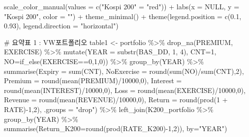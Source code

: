 \documentclass[
  a4paper,
  DIV=11,
  numbers=noendperiod]{scrreprt}
\newenvironment{Shaded}{\begin{snugshade}}{\end{snugshade}}
\newcommand{\AttributeTok}[1]{\textcolor[rgb]{0.40,0.45,0.13}{#1}}
\newcommand{\CommentTok}[1]{\textcolor[rgb]{0.37,0.37,0.37}{#1}}
\newcommand{\ConstantTok}[1]{\textcolor[rgb]{0.56,0.35,0.01}{#1}}
\newcommand{\DecValTok}[1]{\textcolor[rgb]{0.68,0.00,0.00}{#1}}
\newcommand{\FloatTok}[1]{\textcolor[rgb]{0.68,0.00,0.00}{#1}}
\newcommand{\FunctionTok}[1]{\textcolor[rgb]{0.28,0.35,0.67}{#1}}
\newcommand{\NormalTok}[1]{\textcolor[rgb]{0.00,0.23,0.31}{#1}}
\newcommand{\OtherTok}[1]{\textcolor[rgb]{0.00,0.23,0.31}{#1}}
\newcommand{\SpecialCharTok}[1]{\textcolor[rgb]{0.37,0.37,0.37}{#1}}
\newcommand{\StringTok}[1]{\textcolor[rgb]{0.13,0.47,0.30}{#1}}
\begin{document}
\begin{Shaded}
\begin{Highlighting}[]
  \FunctionTok{scale\_color\_manual}\NormalTok{(}\AttributeTok{values =} \FunctionTok{c}\NormalTok{(}\StringTok{"Kospi 200"} \OtherTok{=} \StringTok{"red"}\NormalTok{)) }\SpecialCharTok{+}
  \FunctionTok{labs}\NormalTok{(}\AttributeTok{x =} \ConstantTok{NULL}\NormalTok{, }\AttributeTok{y =} \StringTok{"Kospi 200"}\NormalTok{, }\AttributeTok{color =} \StringTok{""}\NormalTok{) }\SpecialCharTok{+}
  \FunctionTok{theme\_minimal}\NormalTok{() }\SpecialCharTok{+}
  \FunctionTok{theme}\NormalTok{(}\AttributeTok{legend.position =} \FunctionTok{c}\NormalTok{(}\FloatTok{0.1}\NormalTok{, }\FloatTok{0.93}\NormalTok{), }\AttributeTok{legend.direction =} \StringTok{"horizontal"}\NormalTok{)}

\CommentTok{\# 요약표 1 : VW포트폴리오}
\NormalTok{table1 }\OtherTok{\textless{}{-}}\NormalTok{ portfolio }\SpecialCharTok{\%\textgreater{}\%}
  \FunctionTok{drop\_na}\NormalTok{(PREMIUM, EXERCISE) }\SpecialCharTok{\%\textgreater{}\%}
  \FunctionTok{mutate}\NormalTok{(}\AttributeTok{YEAR =} \FunctionTok{substr}\NormalTok{(BAS\_DD, }\DecValTok{1}\NormalTok{, }\DecValTok{4}\NormalTok{),}
         \AttributeTok{CNT=}\DecValTok{1}\NormalTok{,}
         \AttributeTok{NO=}\FunctionTok{if\_else}\NormalTok{(EXERCISE}\SpecialCharTok{==}\DecValTok{0}\NormalTok{,}\DecValTok{1}\NormalTok{,}\DecValTok{0}\NormalTok{)) }\SpecialCharTok{\%\textgreater{}\%}
  \FunctionTok{group\_by}\NormalTok{(YEAR) }\SpecialCharTok{\%\textgreater{}\%}
  \FunctionTok{summarise}\NormalTok{(}\AttributeTok{Expiry =} \FunctionTok{sum}\NormalTok{(CNT),}
            \AttributeTok{NoExercise =} \FunctionTok{round}\NormalTok{(}\FunctionTok{sum}\NormalTok{(NO)}\SpecialCharTok{/}\FunctionTok{sum}\NormalTok{(CNT),}\DecValTok{2}\NormalTok{),}
            \AttributeTok{Premium =} \FunctionTok{round}\NormalTok{(}\FunctionTok{mean}\NormalTok{(PREMIUM)}\SpecialCharTok{/}\DecValTok{10000}\NormalTok{,}\DecValTok{0}\NormalTok{),}
            \AttributeTok{Interest =} \FunctionTok{round}\NormalTok{(}\FunctionTok{mean}\NormalTok{(INTEREST)}\SpecialCharTok{/}\DecValTok{10000}\NormalTok{,}\DecValTok{0}\NormalTok{),}
            \AttributeTok{Loss =} \FunctionTok{round}\NormalTok{(}\FunctionTok{mean}\NormalTok{(EXERCISE)}\SpecialCharTok{/}\DecValTok{10000}\NormalTok{,}\DecValTok{0}\NormalTok{),}
            \AttributeTok{Revenue =} \FunctionTok{round}\NormalTok{(}\FunctionTok{mean}\NormalTok{(REVENUE)}\SpecialCharTok{/}\DecValTok{10000}\NormalTok{,}\DecValTok{0}\NormalTok{),}
            \AttributeTok{Return =} \FunctionTok{round}\NormalTok{(}\FunctionTok{prod}\NormalTok{(}\DecValTok{1} \SpecialCharTok{+}\NormalTok{ RATE)}\SpecialCharTok{{-}}\DecValTok{1}\NormalTok{,}\DecValTok{2}\NormalTok{),}
            \AttributeTok{.groups =} \StringTok{"drop"}\NormalTok{) }\SpecialCharTok{\%\textgreater{}\%} 
  \FunctionTok{left\_join}\NormalTok{(K200\_portfolio }\SpecialCharTok{\%\textgreater{}\%} \FunctionTok{group\_by}\NormalTok{(YEAR) }\SpecialCharTok{\%\textgreater{}\%} \FunctionTok{summarise}\NormalTok{(}\AttributeTok{Return\_K200=}\FunctionTok{round}\NormalTok{(}\FunctionTok{prod}\NormalTok{(RATE\_K200)}\SpecialCharTok{{-}}\DecValTok{1}\NormalTok{,}\DecValTok{2}\NormalTok{)),}
            \AttributeTok{by=}\StringTok{"YEAR"}\NormalTok{)}


\end{Highlighting}
\end{Shaded}
\end{document}

